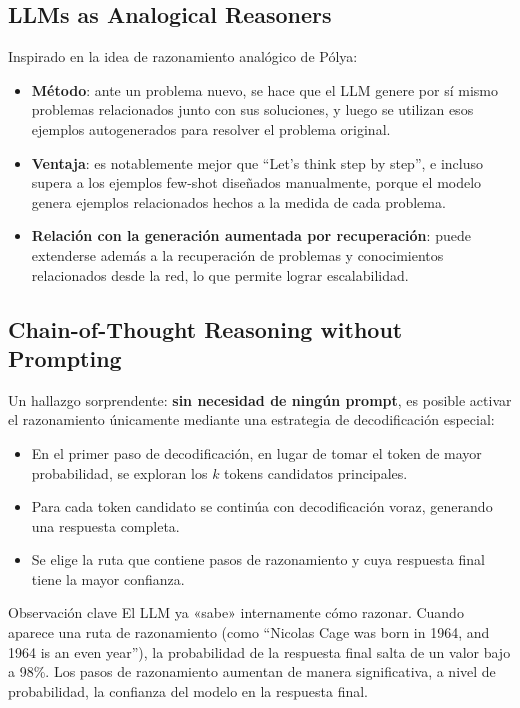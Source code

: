 \subsection{LLMs as Analogical Reasoners}

Inspirado en la idea de razonamiento analógico de P\'{o}lya:

\begin{itemize}
    \item \textbf{Método}: ante un problema nuevo, se hace que el LLM genere por sí mismo problemas relacionados junto con sus soluciones, y luego se utilizan esos ejemplos autogenerados para resolver el problema original.
    \item \textbf{Ventaja}: es notablemente mejor que ``Let's think step by step'', e incluso supera a los ejemplos few-shot diseñados manualmente, porque el modelo genera ejemplos relacionados hechos a la medida de cada problema.
    \item \textbf{Relación con la generación aumentada por recuperación}: puede extenderse además a la recuperación de problemas y conocimientos relacionados desde la red, lo que permite lograr escalabilidad.
\end{itemize}

\subsection{Chain-of-Thought Reasoning without Prompting}

Un hallazgo sorprendente: \textbf{sin necesidad de ningún prompt}, es posible activar el razonamiento únicamente mediante una estrategia de decodificación especial:

\begin{itemize}
    \item En el primer paso de decodificación, en lugar de tomar el token de mayor probabilidad, se exploran los $k$ tokens candidatos principales.
    \item Para cada token candidato se continúa con decodificación voraz, generando una respuesta completa.
    \item Se elige la ruta que contiene pasos de razonamiento y cuya respuesta final tiene la mayor confianza.
\end{itemize}

\begin{importantbox}{Observación clave}
El LLM ya «sabe» internamente cómo razonar. Cuando aparece una ruta de razonamiento (como ``Nicolas Cage was born in 1964, and 1964 is an even year''), la probabilidad de la respuesta final salta de un valor bajo a 98\%. Los pasos de razonamiento aumentan de manera significativa, a nivel de probabilidad, la confianza del modelo en la respuesta final.
\end{importantbox}

